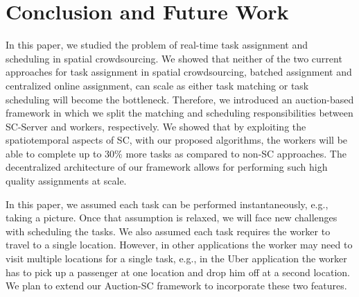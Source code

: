 \section{Conclusion and Future Work}
\label{sec:future}

In this paper, we studied the problem of real-time task assignment and scheduling in spatial crowdsourcing. We showed that neither of the two current approaches for task assignment in spatial crowdsourcing, batched assignment and centralized online assignment, can scale as either task matching or task scheduling will become the bottleneck. Therefore, we introduced an auction-based framework in which we split the matching and scheduling responsibilities between SC-Server and workers, respectively. We showed that by exploiting the spatiotemporal aspects of SC, with our proposed algorithms, the workers will be able to complete up to 30\% more tasks as compared to non-SC approaches. The decentralized architecture of our framework allows for performing such high quality assignments at scale.

In this paper, we assumed each task can be performed instantaneously, e.g., taking a picture. Once that assumption is relaxed, we will face new challenges with scheduling the tasks. We also assumed each task requires the worker to travel to a single location. However, in other applications the worker may need to visit multiple locations for a single task, e.g., in the Uber application the worker has to pick up a passenger at one location and drop him off at a second location. We plan to extend our Auction-SC framework to incorporate these two features.